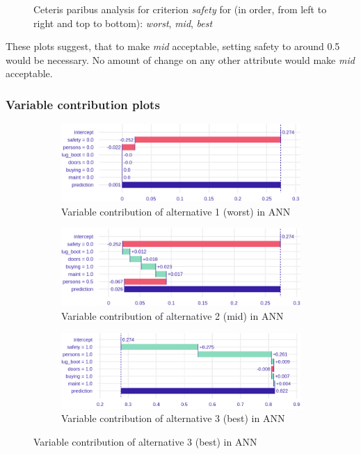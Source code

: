 \documentclass[../main.tex]{subfiles}
\begin{document}
\begin{figure}[H]
\begin{subfigure}[b]{0.4\linewidth}
    \end{subfigure}

    \caption{Ceteris paribus analysis for criterion \emph{safety} for (in order, from left to right and
    top to bottom): \emph{worst}, \emph{mid}, \emph{best}}
\end{figure}

These plots suggest, that to make \emph{mid} acceptable, setting safety to around
0.5 would be necessary. No amount of change on any other attribute would make \emph{mid} acceptable.

\subsubsection{Variable contribution plots}
\begin{figure}[H]
    \centering
    \begin{subfigure}{0.8\linewidth}
        \includegraphics[width=\linewidth]{../img/ANN-breakdown-worst.png}
        \caption{Variable contribution of alternative 1 (worst) in ANN}
        \label{fig:ANN-3alt1-contrib}
    \end{subfigure}
    \begin{subfigure}{0.8\linewidth}
        \includegraphics[width=\linewidth]{../img/ANN-breakdown-mid.png}
        \caption{Variable contribution of alternative 2 (mid) in ANN}
        \label{fig:ANN-3alt2-contrib}
    \end{subfigure}
    \centering
    \begin{subfigure}{0.8\linewidth}
        \includegraphics[width=\linewidth]{../img/ANN-breakdown-best.png}
        \caption{Variable contribution of alternative 3 (best) in ANN}
        \label{fig:ANN-3alt3-contrib}
    \end{subfigure}
\end{figure}
\end{document}
